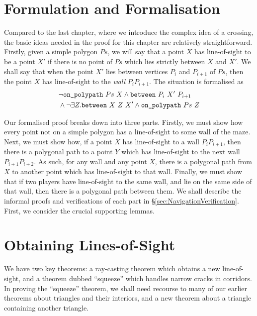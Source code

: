 \section{Formulation and Formalisation}\label{sec:Jordan2Formulation}
Compared to the last chapter, where we introduce the complex idea of a crossing, the basic ideas needed in the proof for this chapter are relatively straightforward. Firstly, given a simple polygon $Ps$, we will say that a point $X$ has line-of-sight to be a point $X'$ if there is no point of $Ps$ which lies strictly between $X$ and $X'$. We shall say that when the point $X'$ lies between vertices $P_i$ and $P_{i+1}$ of $Ps$, then the point $X$ has line-of-sight to the \emph{wall} $P_iP_{i+1}$. The situation is formalised as
\begin{displaymath}
  \begin{aligned}
    &\neg\texttt{on\_polypath}\ Ps\ X \wedge \texttt{between}\ P_i\ X'\ P_{i+1}\\
    &\wedge \neg\exists Z. \texttt{between}\ X\ Z\ X' \wedge \texttt{on\_polypath}\ Ps\ Z
  \end{aligned}
\end{displaymath}

Our formalised proof breaks down into three parts. Firstly, we must show how every point not on a simple polygon has a line-of-sight to some wall of the maze. Next, we must show how, if a point $X$ has line-of-sight to a wall $P_iP_{i+1}$, then there is a polygonal path to a point $Y$ which has line-of-sight to the next wall $P_{i+1}P_{i+2}$. As such, for any wall and any point $X$, there is a polygonal path from $X$ to another point which has line-of-sight to that wall. Finally, we must show that if two players have line-of-sight to the same wall, and lie on the same side of that wall, then there is a polygonal path between them.
We shall describe the informal proofs and verifications of each part in \S\ref{sec:NavigationVerification}. First, we consider the crucial supporting lemmas.

\section{Obtaining Lines-of-Sight}\label{sec:Jordan2Lemmas}
We have two key theorems: a ray-casting theorem which obtains a new line-of-sight, and a theorem dubbed ``squeeze'' which handles narrow cracks in corridors. In proving the ``squeeze'' theorem, we shall need recourse to many of our earlier theorems about triangles and their interiors, and a new theorem about a triangle containing another triangle.

